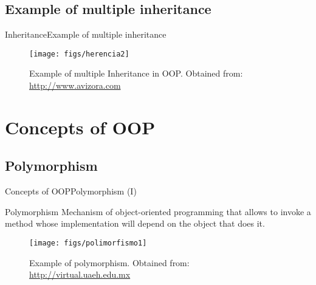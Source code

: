 \documentclass[10pt,compress]{beamer} %
\begin{document}
\subsection{Example of multiple inheritance}
\begin{frame}{Inheritance}{Example of multiple inheritance}
	\begin{figure}
		\texttt{[image: figs/herencia2]}
		\caption{{\scriptsize Example of multiple Inheritance in OOP. Obtained from: \url{http://www.avizora.com}}}
	\end{figure}
\end{frame}

\section{Concepts of OOP}
\subsection{Polymorphism}

\begin{frame}{Concepts of OOP}{Polymorphism (I)}
\vspace{-0.2cm}
	\begin{block}{Polymorphism}
		Mechanism of object-oriented programming that allows to invoke a method whose implementation will depend on the object that does it.
  	\end{block}	
	\begin{figure}
	  \vspace{-0.2cm}
		\texttt{[image: figs/polimorfismo1]}
		\vspace{-0.2cm}
		\caption{\scriptsize{Example of polymorphism. Obtained from: \url{http://virtual.uaeh.edu.mx}}}
	\end{figure}
\end{frame}

\end{document}
